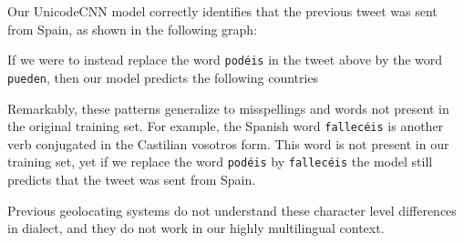 \documentclass[sigconf,anonymous,review]{acmart}
\newcommand{\str}[1]{\texttt{#1}}
\newcommand{\defn}[1]{\textit{#1}}
\newcommand{\uniloc}{\textsc{UniLoc}}
\begin{document}
\begin{description}
{%

Our UnicodeCNN model correctly identifies that the previous tweet was sent from Spain,
as shown in the following graph:

\noindent

\noindent
If we were to instead replace the word \str{pod\'eis} in the tweet above by the word \str{pueden},
then our model predicts the following countries

\noindent

\noindent
Remarkably, these patterns generalize to misspellings and words not present in the original training set.
For example, the Spanish word \str{fallec\'eis} is another verb conjugated in the Castilian vosotros form.
This word is not present in our training set,
yet if we replace the word \str{pod\'eis} by \str{fallec\'eis} the model still predicts that the tweet was sent from Spain.

\noindent

\noindent
Previous geolocating systems do not understand these character level differences in dialect,
and they do not work in our highly multilingual context.
}




\end{description}
\end{document}
